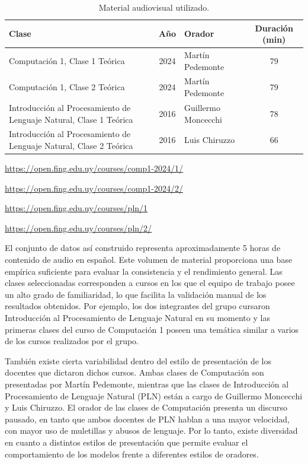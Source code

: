 \begin{table}[h]
\centering
\caption{Material audiovisual utilizado.}
\label{tab:material-audiovisual}
\begin{threeparttable}
\begin{tabular}{|p{5cm}|c|p{3.8cm}|c|}
\hline
\textbf{Clase} & \textbf{Año} & \textbf{Orador} & \textbf{Duración (min)} \\
\hline
Computación 1, Clase 1 Teórica\tnote{a} & 2024 & Martín Pedemonte & 79 \\
\hline
Computación 1, Clase 2 Teórica\tnote{b} & 2024 & Martín Pedemonte & 79 \\
\hline
Introducción al Procesamiento de Lenguaje Natural, Clase 1 Teórica\tnote{c} & 2016 & Guillermo Moncecchi & 78 \\
\hline
Introducción al Procesamiento de Lenguaje Natural, Clase 2 Teórica\tnote{d} & 2016 & Luis Chiruzzo & 66 \\
\hline
\end{tabular}
\begin{tablenotes}
\footnotesize
\item[a] \url{https://open.fing.edu.uy/courses/comp1-2024/1/}
\item[b] \url{https://open.fing.edu.uy/courses/comp1-2024/2/}
\item[c] \url{https://open.fing.edu.uy/courses/pln/1}
\item[d] \url{https://open.fing.edu.uy/courses/pln/2/}
\end{tablenotes}
\end{threeparttable}
\end{table}

El conjunto de datos así construido representa aproximadamente 5 horas de contenido de audio en español. Este volumen de material proporciona una base empírica suficiente para evaluar la consistencia y el rendimiento general. Las clases seleccionadas corresponden a cursos en los que el equipo de trabajo posee un alto grado de familiaridad, lo que facilita la validación manual de los resultados obtenidos. Por ejemplo, los dos integrantes del grupo cursaron Introducción al Procesamiento de Lenguaje Natural en su momento y las primeras clases del curso de Computación 1 poseen una temática similar a varios de los cursos realizados por el grupo.

También existe cierta variabilidad dentro del estilo de presentación de los docentes que dictaron dichos cursos. Ambas clases de Computación son presentadas por Martín Pedemonte, mientras que las clases de Introducción al Procesamiento de Lenguaje Natural (PLN) están a cargo de Guillermo Moncecchi y Luis Chiruzzo. El orador de las clases de Computación presenta un discurso pausado, en tanto que ambos docentes de PLN hablan a una mayor velocidad, con mayor uso de muletillas y abusos de lenguaje. Por lo tanto, existe diversidad en cuanto a distintos estilos de presentación que permite evaluar el comportamiento de los modelos frente a diferentes estilos de oradores.

